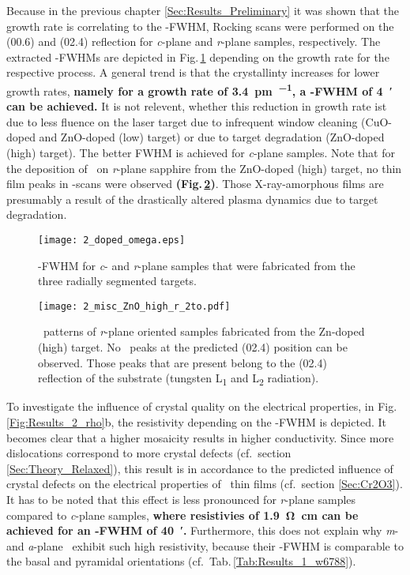 Because in the previous chapter \ref{Sec:Results_Preliminary} it was shown that the growth rate is correlating to the \textomega-FWHM, Rocking scans were performed on the (00.6) and (02.4) reflection for \textit{c}-plane and \textit{r}-plane samples, respectively.
The extracted \textomega-FWHMs are depicted in Fig.\,\ref{Fig:Results_2_omega} depending on the growth rate for the respective process.
A general trend is that the crystallinty increases for lower growth rates, \textbf{namely for a growth rate of \qty{3.4}{\pm\per\pulse}, a \textomega-FWHM of \qty{4}{\arcminute} can be achieved.}
It is not relevent, whether this reduction in growth rate ist due to less fluence on the laser target due to infrequent window cleaning (CuO-doped and ZnO-doped (low) target) or due to target degradation (ZnO-doped (high) target).
The better FWHM is achieved for \textit{c}-plane samples.
Note that for the deposition of \cro\ on \textit{r}-plane sapphire from the ZnO-doped (high) target, no thin film peaks in \thetaomega-scans were observed \textbf{(Fig.\,\ref{Fig:App_2_ZnO_H_rAmorphous})}.
Those X-ray-amorphous films are presumably a result of the drastically altered plasma dynamics due to target degradation.
\begin{figure}
    \centering
    \texttt{[image: 2\_doped\_omega.eps]}
    \caption{\textomega-FWHM for \textit{c}- and \textit{r}-plane samples that were fabricated from the three radially segmented targets.}
    \label{Fig:Results_2_omega}
\end{figure}
\begin{figure}
    \centering
    \texttt{[image: 2\_misc\_ZnO\_high\_r\_2to.pdf]}
    \caption{
        \thetaomega\ patterns of \textit{r}-plane oriented samples fabricated from the Zn-doped (high) target.
        No \cro\ peaks at the predicted (02.4) position can be observed.
        Those peaks that are present belong to the (02.4) reflection of the substrate (tungsten L\textalpha\textsubscript{1} and L\textalpha\textsubscript{2} radiation).
    }
    \label{Fig:App_2_ZnO_H_rAmorphous}
\end{figure}

{%
\sloppy
To investigate the influence of crystal quality on the electrical properties, in Fig.\,\ref{Fig:Results_2_rho}b, the resistivity depending on the \textomega-FWHM is depicted. %
It becomes clear that a higher mosaicity results in higher conductivity.
Since more dislocations correspond to more crystal defects (cf.\ section \ref{Sec:Theory_Relaxed}), this result is in accordance to the predicted influence of crystal defects on the electrical properties of \cro\ thin films (cf.\ section \ref{Sec:Cr2O3}).
It has to be noted that this effect is less pronounced for \textit{r}-plane samples compared to \textit{c}-plane samples, \textbf{where resistivies of \qty{1.9}{\ohm\cm} can be achieved for an \textomega-FWHM of \qty{40}{\arcminute}.}
Furthermore, this does not explain why \textit{m}- and \textit{a}-plane \cro\ exhibit such high resistivity, because their \textomega-FWHM is comparable to the basal and pyramidal orientations (cf.\ Tab.\,\ref{Tab:Results_1_w6788}).
\par}

